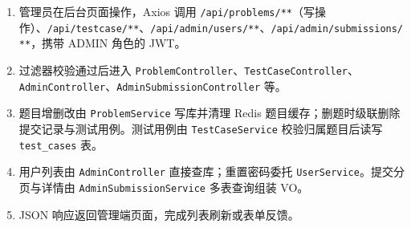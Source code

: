 \begin{enumerate}
    \item 管理员在后台页面操作，Axios 调用 \texttt{/api/problems/**}（写操作）、\texttt{/api/testcase/**}、\texttt{/api/admin/users/**}、\texttt{/api/admin/submissions/**}，携带 ADMIN 角色的 JWT。

    \item 过滤器校验通过后进入 \texttt{ProblemController}、\texttt{TestCaseController}、\texttt{AdminController}、\texttt{AdminSubmissionController} 等。

    \item 题目增删改由 \texttt{ProblemService} 写库并清理 Redis 题目缓存；删题时级联删除提交记录与测试用例。测试用例由 \texttt{TestCaseService} 校验归属题目后读写 \texttt{test\_cases} 表。

    \item 用户列表由 \texttt{AdminController} 直接查库；重置密码委托 \texttt{UserService}。提交分页与详情由 \texttt{AdminSubmissionService} 多表查询组装 VO。

    \item JSON 响应返回管理端页面，完成列表刷新或表单反馈。
\end{enumerate}

